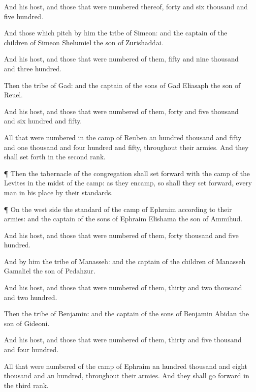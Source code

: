 {And his
host, and those that were
numbered thereof,
{}
forty and
six
thousand and
five
hundred.

And those which
pitch by him
{} the
tribe of
Simeon: and the
captain of the
children of
Simeon
{}
Shelumiel the
son of
Zurishaddai.

And his
host, and those that were
numbered of them,
{}
fifty and
nine
thousand and
three
hundred.

Then the
tribe of
Gad: and the
captain of the
sons of
Gad
{}
Eliasaph the
son of
Reuel.

And his
host, and those that were
numbered of them,
{}
forty and
five
thousand and
six
hundred and
fifty.

All that were
numbered in the
camp of
Reuben
{} an
hundred
thousand and
fifty and
one
thousand and
four
hundred and
fifty, throughout their
armies. And they shall set
forth in the second
rank.


\par }{\PP {}¶ Then the
tabernacle of the
congregation shall set
forward with the
camp of the
Levites in the
midst of the
camp: as they
encamp, so shall they set
forward, every
man in his
place by their
standards.


\par }{\PP {}¶ On the west
side
{} the
standard of the
camp of
Ephraim according to their
armies: and the
captain of the
sons of
Ephraim
{}
Elishama the
son of
Ammihud.

And his
host, and those that were
numbered of them,
{}
forty
thousand and
five
hundred.

And by him
{} the
tribe of
Manasseh: and the
captain of the
children of
Manasseh
{}
Gamaliel the
son of
Pedahzur.

And his
host, and those that were
numbered of them,
{}
thirty and
two
thousand and two
hundred.

Then the
tribe of
Benjamin: and the
captain of the
sons of
Benjamin
{}
Abidan the
son of
Gideoni.

And his
host, and those that were
numbered of them,
{}
thirty and
five
thousand and
four
hundred.

All that were
numbered of the
camp of
Ephraim
{} an
hundred
thousand and
eight
thousand and an
hundred, throughout their
armies. And they shall go
forward in the third
rank.


}
